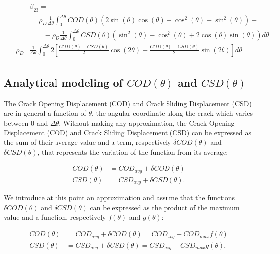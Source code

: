 \documentclass[review]{elsarticle}
\begin{document}
\begin{equation}
\begin{aligned}
&\beta_{23}=\\
&=\rho_{D}\frac{1}{\Delta\theta}\int_{0}^{\Delta\theta}COD\left(\theta\right)\left(2\sin{\left(\theta\right)}\cos{\left(\theta\right)}+\cos^{2}{\left(\theta\right)}-\sin^{2}\left(\theta\right)\right)+\\
&\qquad-\rho_{D}\frac{1}{\Delta\theta}\int_{0}^{\Delta\theta}CSD\left(\theta\right)\left(\sin^{2}{\left(\theta\right)}-\cos^{2}{\left(\theta\right)}+2\cos{\left(\theta\right)}\sin{\left(\theta\right)}\right)d\theta=\\
=\rho_{D}&\frac{1}{\Delta\theta}\int_{0}^{\Delta\theta}2\left[\frac{COD\left(\theta\right)+CSD\left(\theta\right)}{2}\cos\left(2\theta\right)+\frac{COD\left(\theta\right)-CSD\left(\theta\right)}{2}\sin\left(2\theta\right)\right]d\theta\\
\end{aligned}
\end{equation}

\subsection{Analytical modeling of $COD\left(\theta\right)$ and $CSD\left(\theta\right)$}

The Crack Opening Displacement (COD) and Crack Sliding Displacement (CSD) are in general a function of $\theta$, the angular coordinate along the crack which varies between $0$ and $\Delta\theta$. Without making any approximation, the Crack Opening Displacement (COD) and Crack Sliding Displacement (CSD) can be expressed as the sum of their average value and a term, respectively $\delta COD\left(\theta\right)$ and $\delta CSD\left(\theta\right)$, that represents the variation of the function from its average:

\begin{equation}
\begin{aligned}
COD\left(\theta\right)&=COD_{avg}+\delta COD\left(\theta\right)\\
CSD\left(\theta\right)&=CSD_{avg}+\delta CSD\left(\theta\right).
\end{aligned}
\end{equation}

We introduce at this point an approximation and assume that the functions $\delta COD\left(\theta\right)$ and $\delta CSD\left(\theta\right)$ can be expressed as the product of the maximum value and a function, respectively $f\left(\theta\right)$ and $g\left(\theta\right)$:

\begin{equation}
\begin{aligned}
COD\left(\theta\right)&=COD_{avg}+\delta COD\left(\theta\right)=COD_{avg}+COD_{max}f\left(\theta\right)\\
CSD\left(\theta\right)&=CSD_{avg}+\delta CSD\left(\theta\right)=CSD_{avg}+CSD_{max}g\left(\theta\right),
\end{aligned}
\end{equation}
\end{document}
